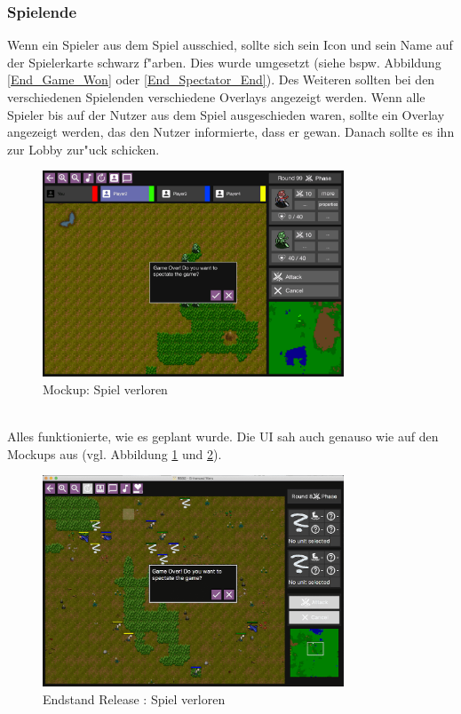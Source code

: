 \documentclass[12pt, titlepage]{scrartcl}
\newcommand{\RN}[1]{%
	\textup{\uppercase\expandafter{\romannumeral#1}}%
}
\newcounter{subsubsubsection}[subsubsection]
\begin{document}
			\subsubsection{Spielende}
				Wenn ein Spieler aus dem Spiel ausschied, sollte sich sein Icon und sein Name auf der Spielerkarte schwarz f"arben. Dies wurde umgesetzt (siehe bspw. Abbildung \ref{End_Game_Won} oder \ref{End_Spectator_End}). Des Weiteren sollten bei den verschiedenen Spielenden verschiedene Overlays angezeigt werden.
					Wenn alle Spieler bis auf der Nutzer aus dem Spiel ausgeschieden waren, sollte ein Overlay angezeigt werden, das den Nutzer informierte, dass er gewan. Danach sollte es ihn zur Lobby zur"uck schicken.
					\begin{figure}[H] 
						\centering
						\includegraphics[width=0.8\textwidth]{images/mockups/GameOver.png}
						\caption{Mockup: Spiel verloren}
						\label{Game_Lost_2}
					\end{figure}
					\ \\ Alles funktionierte, wie es geplant wurde. Die UI sah auch genauso wie auf den Mockups aus (vgl. Abbildung \ref{Game_Lost_2} und \ref{End_Game_Lost}).
					\begin{figure}[H] 
						\centering
						\includegraphics[width=0.8\textwidth]{images/endOfRelease/GameOver.png}
						\caption{Endstand Release \RN{3}: Spiel verloren}
						\label{End_Game_Lost}
					\end{figure}
\end{document}
